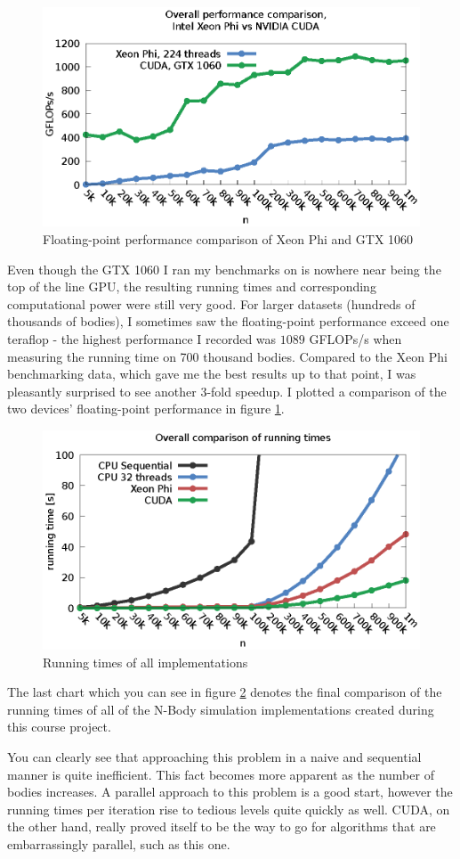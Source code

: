 \documentclass[journal]{IEEEtran}
\begin{document}
			\begin{figure}[ht]			
				\centering
				\includegraphics[width=.5\textwidth]{gnuplot/cuda.eps}
				\caption{\label{cuda}Floating-point performance comparison of Xeon Phi and GTX 1060}
			\end{figure} 
			
			Even though the GTX 1060 I ran my benchmarks on is nowhere near being the top of the line GPU, the resulting running times and corresponding computational power were still very good. For larger datasets (hundreds of thousands of bodies), I sometimes saw the floating-point performance exceed one teraflop - the highest performance I recorded was $1089$ GFLOPs/s when measuring the running time on 700 thousand bodies. Compared to the Xeon Phi benchmarking data, which gave me the best results up to that point, I was pleasantly surprised to see another 3-fold speedup. I plotted a comparison of the two devices' floating-point performance in figure \ref{cuda}.	
		
		\begin{figure}[ht]			
			\centering
			\includegraphics[width=.5\textwidth]{gnuplot/big_comparison.eps}
			\caption{\label{comparo}Running times of all implementations}
		\end{figure} 
		
		The last chart which you can see in figure \ref{comparo} denotes the final comparison of the running times of all of the N-Body simulation implementations created during this course project. 
		
		You can clearly see that approaching this problem in a naive and sequential manner is quite inefficient. This fact becomes more apparent as the number of bodies increases. A parallel approach to this problem is a good start, however the running times per iteration rise to tedious levels quite quickly as well. CUDA, on the other hand, really proved itself to be the way to go for algorithms that are embarrassingly parallel, such as this one.
		
\end{document}

